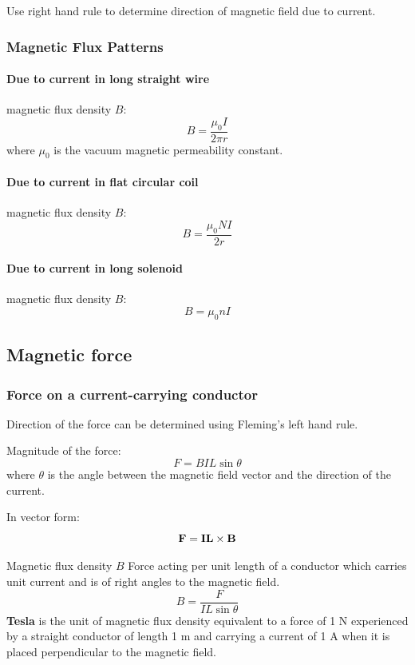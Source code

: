 Use right hand rule to determine direction of magnetic field due to current.

\subsubsection{Magnetic Flux Patterns}
\paragraph{Due to current in long straight wire}
magnetic flux density $B$:
\begin{equation}
B = \frac{\mu_0I}{2\pi r}
\end{equation}
where $\mu_0$ is the vacuum magnetic permeability constant.

\paragraph{Due to current in flat circular coil}
magnetic flux density $B$:
\begin{equation}
B = \frac{\mu_0 NI}{2r}
\end{equation}

\paragraph{Due to current in long solenoid}
magnetic flux density $B$:
\begin{equation}
B = \mu_0 nI
\end{equation}

\subsection{Magnetic force}
\subsubsection{Force on a current-carrying conductor}
Direction of the force can be determined using Fleming’s left hand rule. 

Magnitude of the force:
\begin{equation}
F = BIL\sin\theta
\end{equation}
where $\theta$ is the angle between the magnetic field vector and the direction of the current.

In vector form:
\[ \vb{F} = \vb{IL} \times \vb{B} \]

\begin{defn}{Magnetic flux density $B$}{}
Force acting per unit length of a conductor which carries unit current and is of right angles to the magnetic field.
\[ B = \frac{F}{IL\sin\theta} \]
\textbf{Tesla} is the unit of magnetic flux density equivalent to a force of 1 \unit{N} experienced by a straight conductor of length 1 \unit{m} and carrying a current of 1 \unit{A} when it is placed perpendicular to the magnetic field.
\end{defn}


